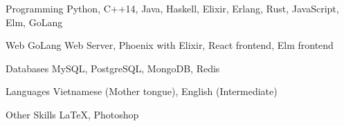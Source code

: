 


\begin{cvskills}


\cvskill
{Programming} %
{Python, C++14, Java, Haskell, Elixir, Erlang, Rust, JavaScript, Elm, GoLang} %


\cvskill
{Web} %
{GoLang Web Server, Phoenix with Elixir, React frontend, Elm frontend} %

\cvskill
{Databases} %
{MySQL, PostgreSQL, MongoDB, Redis} %


\cvskill
{Languages} %
{Vietnamese (Mother tongue), English (Intermediate)} %


\cvskill
{Other Skills} %
{LaTeX, Photoshop}%


\end{cvskills}
